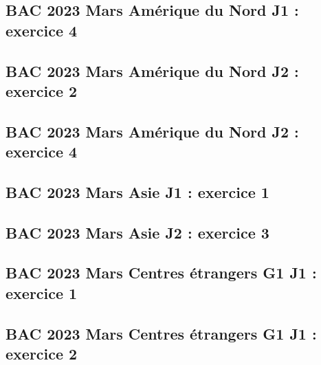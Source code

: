\documentclass[lang=fr,edition=teacher,layout=sheet]{mxbook}
\begin{document}
\begingroup\endgroup
\par\bigskip
{}\subsection*{BAC 2023 Mars Amérique du Nord J1 : exercice 4}
\begingroup\endgroup
\par\bigskip
{}\subsection*{BAC 2023 Mars Amérique du Nord J2 : exercice 2}
\begingroup\endgroup
\par\bigskip
{}\subsection*{BAC 2023 Mars Amérique du Nord J2 : exercice 4}
\begingroup\endgroup
\par\bigskip
{}\subsection*{BAC 2023 Mars Asie J1 : exercice 1}
\begingroup\endgroup
\par\bigskip
{}\subsection*{BAC 2023 Mars Asie J2 : exercice 3}
\begingroup\endgroup
\par\bigskip
{}\subsection*{BAC 2023 Mars Centres étrangers G1 J1 : exercice 1}
\begingroup\endgroup
\par\bigskip
{}\subsection*{BAC 2023 Mars Centres étrangers G1 J1 : exercice 2}
\end{document}
